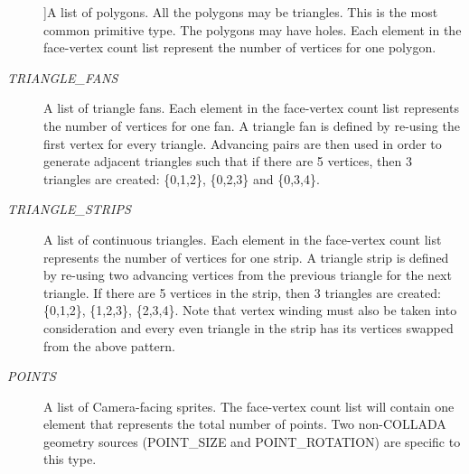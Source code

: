 \begin{Desc}
\begin{description}
{}]A list of polygons. All the polygons may be triangles. This is the most common primitive type. The polygons may have holes. Each element in the face-\/vertex count list represent the number of vertices for one polygon. \item[{\em 
\hypertarget{classFCDGeometryPolygons_a78fd93579665ea37c6d3396f4c4e8facaed47201a0dbf1782843319e2fb7f3ef9}{
TRIANGLE\_\-FANS}
\label{classFCDGeometryPolygons_a78fd93579665ea37c6d3396f4c4e8facaed47201a0dbf1782843319e2fb7f3ef9}
}]A list of triangle fans. Each element in the face-\/vertex count list represents the number of vertices for one fan. A triangle fan is defined by re-\/using the first vertex for every triangle. Advancing pairs are then used in order to generate adjacent triangles such that if there are 5 vertices, then 3 triangles are created: \{0,1,2\}, \{0,2,3\} and \{0,3,4\}. \item[{\em 
\hypertarget{classFCDGeometryPolygons_a78fd93579665ea37c6d3396f4c4e8facada4edb89695314d4168086fd07c62dd7}{
TRIANGLE\_\-STRIPS}
\label{classFCDGeometryPolygons_a78fd93579665ea37c6d3396f4c4e8facada4edb89695314d4168086fd07c62dd7}
}]A list of continuous triangles. Each element in the face-\/vertex count list represents the number of vertices for one strip. A triangle strip is defined by re-\/using two advancing vertices from the previous triangle for the next triangle. If there are 5 vertices in the strip, then 3 triangles are created: \{0,1,2\}, \{1,2,3\}, \{2,3,4\}. Note that vertex winding must also be taken into consideration and every even triangle in the strip has its vertices swapped from the above pattern. \item[{\em 
\hypertarget{classFCDGeometryPolygons_a78fd93579665ea37c6d3396f4c4e8facadef536297623ef77c09b5d7d50e72d04}{
POINTS}
\label{classFCDGeometryPolygons_a78fd93579665ea37c6d3396f4c4e8facadef536297623ef77c09b5d7d50e72d04}
}]A list of Camera-\/facing sprites. The face-\/vertex count list will contain one element that represents the total number of points. Two non-\/COLLADA geometry sources (POINT\_\-SIZE and POINT\_\-ROTATION) are specific to this type. \end{description}
\end{Desc}



